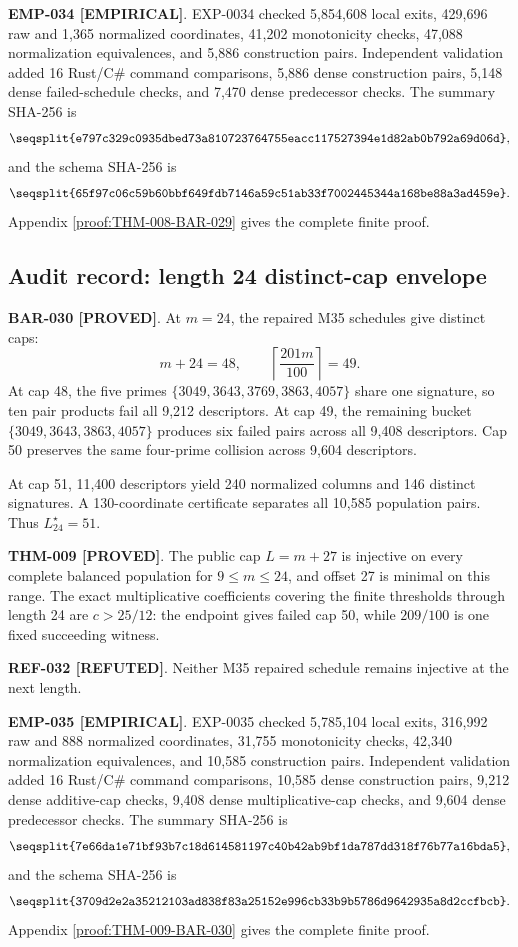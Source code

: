 \documentclass[11pt]{article}
\newcommand{\claimstatus}[2]{\textbf{#1 [#2]}}
\begin{document}
\claimstatus{EMP-034}{EMPIRICAL}. EXP-0034 checked 5,854,608 local exits,
429,696 raw and 1,365 normalized coordinates, 41,202 monotonicity checks,
47,088 normalization equivalences, and 5,886 construction pairs.
Independent validation added 16 Rust/C\# command comparisons, 5,886 dense
construction pairs, 5,148 dense failed-schedule checks, and 7,470 dense
predecessor checks. The summary SHA-256 is
\[
\texttt{\seqsplit{e797c329c0935dbed73a810723764755eacc117527394e1d82ab0b792a69d06d}},
\]
and the schema SHA-256 is
\[
\texttt{\seqsplit{65f97c06c59b60bbf649fdb7146a59c51ab33f7002445344a168be88a3ad459e}}.
\]
Appendix \ref{proof:THM-008-BAR-029} gives the complete finite proof.

\subsection{Audit record: length 24 distinct-cap envelope}

\claimstatus{BAR-030}{PROVED}. At \(m=24\), the repaired M35 schedules give
distinct caps:
\[
m+24=48,\qquad
\left\lceil\frac{201m}{100}\right\rceil=49.
\]
At cap 48, the five primes
\(\{3049,3643,3769,3863,4057\}\) share one signature, so ten pair products
fail all 9,212 descriptors. At cap 49, the remaining bucket
\(\{3049,3643,3863,4057\}\) produces six failed pairs across all 9,408
descriptors. Cap 50 preserves the same four-prime collision across 9,604
descriptors.

At cap 51, 11,400 descriptors yield 240 normalized columns and 146 distinct
signatures. A 130-coordinate certificate separates all 10,585 population
pairs. Thus \(L_{24}^\star=51\).

\claimstatus{THM-009}{PROVED}. The public cap \(L=m+27\) is injective on
every complete balanced population for \(9\le m\le24\), and offset 27 is
minimal on this range. The exact multiplicative coefficients covering the
finite thresholds through length 24 are \(c>25/12\): the endpoint gives
failed cap 50, while \(209/100\) is one fixed succeeding witness.

\claimstatus{REF-032}{REFUTED}. Neither M35 repaired schedule remains
injective at the next length.

\claimstatus{EMP-035}{EMPIRICAL}. EXP-0035 checked 5,785,104 local exits,
316,992 raw and 888 normalized coordinates, 31,755 monotonicity checks,
42,340 normalization equivalences, and 10,585 construction pairs.
Independent validation added 16 Rust/C\# command comparisons, 10,585 dense
construction pairs, 9,212 dense additive-cap checks, 9,408 dense
multiplicative-cap checks, and 9,604 dense predecessor checks. The summary
SHA-256 is
\[
\texttt{\seqsplit{7e66da1e71bf93b7c18d614581197c40b42ab9bf1da787dd318f76b77a16bda5}},
\]
and the schema SHA-256 is
\[
\texttt{\seqsplit{3709d2e2a35212103ad838f83a25152e996cb33b9b5786d9642935a8d2ccfbcb}}.
\]
Appendix \ref{proof:THM-009-BAR-030} gives the complete finite proof.
\end{document}
